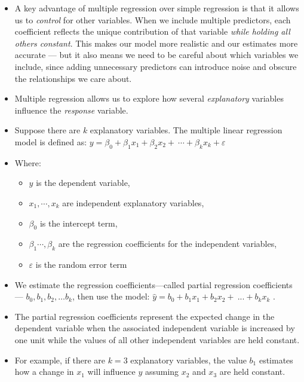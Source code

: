 \documentclass[
  letterpaper,
  DIV=11,
  numbers=noendperiod]{scrreprt}
\providecommand{\tightlist}{%
  \setlength{\itemsep}{0pt}\setlength{\parskip}{0pt}}\usepackage{longtable,booktabs,array}
\begin{document}
\begin{itemize}
\item
  A key advantage of multiple regression over simple regression is that
  it allows us to \emph{control} for other variables. When we include
  multiple predictors, each coefficient reflects the unique contribution
  of that variable \emph{while holding all others constant}. This makes
  our model more realistic and our estimates more accurate --- but it
  also means we need to be careful about which variables we include,
  since adding unnecessary predictors can introduce noise and obscure
  the relationships we care about.
\item
  Multiple regression allows us to explore how several
  \emph{explanatory} variables influence the \emph{response} variable.
\item
  Suppose there are \(k\) explanatory variables. The multiple linear
  regression model is defined as:
  \(y = \beta_0 + \beta_1x_1 + \beta_2x_2 + \ ⋯ + \beta_kx_k +\varepsilon\)
\item
  Where:

  \begin{itemize}
  \tightlist
  \item
    \(y\) is the dependent variable,
  \item
    \(x_1, ⋯, x_k\) are independent explanatory variables,
  \item
    \(\beta_0\) is the intercept term,
  \item
    \(\beta_1 ⋯, \beta_k\) are the regression coefficients for the
    independent variables,
  \item
    \(\varepsilon\) is the random error term
  \end{itemize}
\item
  We estimate the regression coefficients---called partial regression
  coefficients --- \(b_0, b_1, b_2,… b_k\), then use the model:
  \(\hat{y} = b_0 + b_1x_1 + b_2x_2 + \ ... + b_kx_k\) .
\item
  The partial regression coefficients represent the expected change in
  the dependent variable when the associated independent variable is
  increased by one unit while the values of all other independent
  variables are held constant.
\item
  For example, if there are \(k = 3\) explanatory variables, the value
  \(b_1\) estimates how a change in \(x_1\) will influence \(y\)
  assuming \(x_2\) and \(x_3\) are held constant.
\end{itemize}
\end{document}
